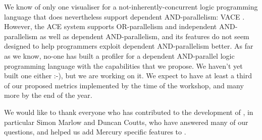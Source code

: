 We know of only one visualiser
for a not-inherently-concurrent logic programming language
that does nevertheless support dependent AND-parallelism: VACE \citep{vace}.
However, the ACE system supports
OR-parallelism and independent AND-parallelism
as well as dependent AND-parallelism,
and its features do not seem designed
to help programmers exploit dependent AND-parallelism better.
As far as we know, no-one has built a profiler
for a dependent AND-parallel logic programming language
with the capabilities that we propose.
We haven't yet built one either :-),
but we are working on it.
We expect to have at least a third of our proposed metrics implemented
by the time of the workshop,
and many more by the end of the year.


We would like to thank everyone
who has contributed to the development of \tscope,
in particular Simon Marlow and Duncan Coutts,
who have answered many of our questions,
and helped us add Mercury specific features to \tscope.



